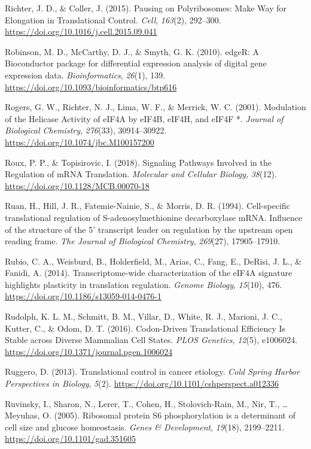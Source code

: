 \documentclass[12pt,openany]{book}
\begin{document}
\hypertarget{ref-Richter2015}{}
Richter, J. D., \& Coller, J. (2015). Pausing on Polyribosomes: Make Way
for Elongation in Translational Control. \emph{Cell}, \emph{163}(2),
292--300. \url{https://doi.org/10.1016/j.cell.2015.09.041}

\hypertarget{ref-Robinson2010}{}
Robinson, M. D., McCarthy, D. J., \& Smyth, G. K. (2010). edgeR: A
Bioconductor package for differential expression analysis of digital
gene expression data. \emph{Bioinformatics}, \emph{26}(1), 139.
\url{https://doi.org/10.1093/bioinformatics/btp616}

\hypertarget{ref-Rogers2001}{}
Rogers, G. W., Richter, N. J., Lima, W. F., \& Merrick, W. C. (2001).
Modulation of the Helicase Activity of eIF4A by eIF4B, eIF4H, and eIF4F
*. \emph{Journal of Biological Chemistry}, \emph{276}(33), 30914--30922.
\url{https://doi.org/10.1074/jbc.M100157200}

\hypertarget{ref-Roux2018}{}
Roux, P. P., \& Topisirovic, I. (2018). Signaling Pathways Involved in
the Regulation of mRNA Translation. \emph{Molecular and Cellular
Biology}, \emph{38}(12). \url{https://doi.org/10.1128/MCB.00070-18}

\hypertarget{ref-Ruan1994}{}
Ruan, H., Hill, J. R., Fatemie-Nainie, S., \& Morris, D. R. (1994).
Cell-specific translational regulation of S-adenosylmethionine
decarboxylase mRNA. Influence of the structure of the 5' transcript
leader on regulation by the upstream open reading frame. \emph{The
Journal of Biological Chemistry}, \emph{269}(27), 17905--17910.

\hypertarget{ref-Rubio2014}{}
Rubio, C. A., Weisburd, B., Holderfield, M., Arias, C., Fang, E.,
DeRisi, J. L., \& Fanidi, A. (2014). Transcriptome-wide characterization
of the eIF4A signature highlights plasticity in translation regulation.
\emph{Genome Biology}, \emph{15}(10), 476.
\url{https://doi.org/10.1186/s13059-014-0476-1}

\hypertarget{ref-Rudolph2016}{}
Rudolph, K. L. M., Schmitt, B. M., Villar, D., White, R. J., Marioni, J.
C., Kutter, C., \& Odom, D. T. (2016). Codon-Driven Translational
Efficiency Is Stable across Diverse Mammalian Cell States. \emph{PLOS
Genetics}, \emph{12}(5), e1006024.
\url{https://doi.org/10.1371/journal.pgen.1006024}

\hypertarget{ref-Ruggero2013}{}
Ruggero, D. (2013). Translational control in cancer etiology. \emph{Cold
Spring Harbor Perspectives in Biology}, \emph{5}(2).
\url{https://doi.org/10.1101/cshperspect.a012336}

\hypertarget{ref-Ruvinsky2005}{}
Ruvinsky, I., Sharon, N., Lerer, T., Cohen, H., Stolovich-Rain, M., Nir,
T., \ldots{} Meyuhas, O. (2005). Ribosomal protein S6 phosphorylation is
a determinant of cell size and glucose homeostasis. \emph{Genes \&
Development}, \emph{19}(18), 2199--2211.
\url{https://doi.org/10.1101/gad.351605}
\end{document}
